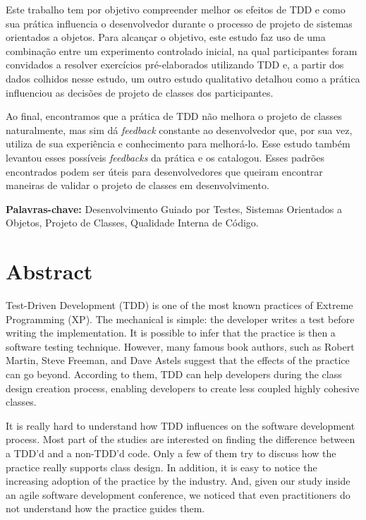 \documentclass[11pt,openany,twoside,a4paper]{book}
\begin{document}
Este trabalho tem por objetivo compreender melhor os efeitos de TDD e como sua prática 
influencia o desenvolvedor durante o processo de projeto de sistemas orientados a objetos.
Para alcançar o objetivo, este estudo faz uso de uma combinação entre um experimento controlado 
inicial, na qual participantes foram
convidados a resolver exercícios pré-elaborados utilizando TDD e, a partir dos dados colhidos nesse estudo, um outro
estudo qualitativo detalhou como a prática influenciou as decisões de projeto de classes dos participantes.

Ao final, encontramos que a prática de TDD não melhora o projeto de classes naturalmente, mas sim
dá \textit{feedback} constante ao desenvolvedor que, por sua vez, utiliza de sua experiência
e conhecimento para melhorá-lo. Esse estudo também levantou esses possíveis \textit{feedbacks} da
prática e os catalogou. Esses padrões encontrados podem ser úteis para desenvolvedores
que queiram encontrar maneiras de validar o projeto de classes em desenvolvimento.

\noindent \textbf{Palavras-chave:} Desenvolvimento Guiado por Testes, Sistemas Orientados
a Objetos, Projeto de Classes, Qualidade Interna de Código.

\chapter*{Abstract}

Test-Driven Development (TDD) is one of the most known practices of Extreme
Programming (XP). The mechanical is simple: the developer writes a test before
writing the implementation. It is possible to infer that the practice is then 
a software testing technique. However, many famous book authors, such as 
Robert Martin, Steve Freeman, and Dave Astels suggest that the effects of the practice
can go beyond. According to them, TDD can help developers during the class design creation
process, enabling developers to create less coupled highly cohesive classes.

It is really hard to understand how TDD influences on the software development
process. Most part of the studies are interested on finding the difference between
a TDD'd and a non-TDD'd code. Only a few of them try to discuss how the practice
really supports class design. In addition, it is easy to notice the increasing
adoption of the practice by the industry. And, given our study
inside an agile software development conference, we noticed that even practitioners
do not understand how the practice guides them.
\end{document}
